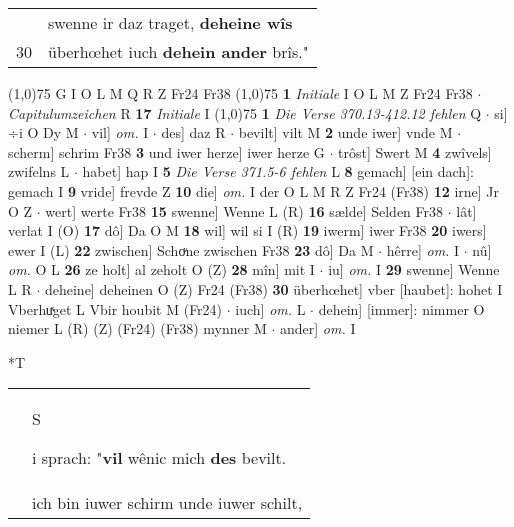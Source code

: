 \documentclass[8pt,a4paper,notitlepage]{article}
\begin{document}
\begin{table}[ht]
\begin{minipage}[t]{0.5\linewidth}
\begin{tabular}{rl}
 & swenne ir daz traget, \textbf{deheine wîs}\\ 
30 & überhœhet iuch \textbf{dehein ander} brîs."\\ 
\end{tabular}
\scriptsize
\line(1,0){75} \newline
G I O L M Q R Z Fr24 Fr38 \newline
\line(1,0){75} \newline
\textbf{1} \textit{Initiale} I O L M Z Fr24 Fr38   $\cdot$ \textit{Capitulumzeichen} R  \textbf{17} \textit{Initiale} I  \newline
\line(1,0){75} \newline
\textbf{1} \textit{Die Verse 370.13-412.12 fehlen} Q   $\cdot$ si] ÷i O Dy M  $\cdot$ vil] \textit{om.} I  $\cdot$ des] daz R  $\cdot$ bevilt] vilt M \textbf{2} unde iwer] vnde M  $\cdot$ scherm] schrim Fr38 \textbf{3} und iwer herze] iwer herze G  $\cdot$ trôst] Swert M \textbf{4} zwîvels] zwifelns L  $\cdot$ habet] hap I \textbf{5} \textit{Die Verse 371.5-6 fehlen} L  \textbf{8} gemach] [ein dach]: gemach I \textbf{9} vride] frevde Z \textbf{10} die] \textit{om.} I der O L M R Z Fr24 (Fr38) \textbf{12} irne] Jr O Z  $\cdot$ wert] werte Fr38 \textbf{15} swenne] Wenne L (R) \textbf{16} sælde] Selden Fr38  $\cdot$ lât] verlat I (O) \textbf{17} dô] Da O M \textbf{18} wil] wil si I (R) \textbf{19} iwerm] iwer Fr38 \textbf{20} iwers] ewer I (L) \textbf{22} zwischen] Schoͮne zwischen Fr38 \textbf{23} dô] Da M  $\cdot$ hêrre] \textit{om.} I  $\cdot$ nû] \textit{om.} O L \textbf{26} ze holt] al zeholt O (Z) \textbf{28} mîn] mit I  $\cdot$ iu] \textit{om.} I \textbf{29} swenne] Wenne L R  $\cdot$ deheine] deheinen O (Z) Fr24 (Fr38) \textbf{30} überhœhet] vber [haubet]: hohet I Vberhuͯget L Vbir houbit M (Fr24)  $\cdot$ iuch] \textit{om.} L  $\cdot$ dehein] [immer]: nimmer O niemer L (R) (Z) (Fr24) (Fr38) mynner M  $\cdot$ ander] \textit{om.} I \newline
\end{minipage}
\hspace{0.5cm}
\begin{minipage}[t]{0.5\linewidth}
\small
\begin{center}*T
\end{center}
\begin{tabular}{rl}
 & \begin{large}S\end{large}i sprach: "\textbf{vil} wênic mich \textbf{des} bevilt.\\ 
 & ich bin iuwer schirm unde iuwer schilt,\\ 

\end{tabular}
\end{minipage}
\end{table}
\end{document}
